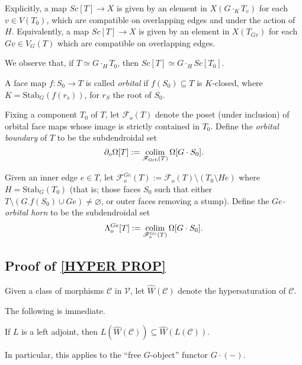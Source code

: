 \documentclass[a4paper,10pt,draft]{article}%
\numberwithin{equation}{section}%
\begin{document}
\begin{remark}
      Explicitly, a map $Sc[T] \to X$ is given by an element in $X(G \cdot_K T_v)$ for each $v \in V(T_0)$,
      which are compatible on overlapping edges and under the action of $H$.
      Equivalently, a map $Sc[T] \to X$ is given by an element in $X(T_{G v})$ for each $G v \in V_G(T)$
      which are compatible on overlapping edges.
\end{remark}

\begin{remark}
      We observe that, if $T \simeq G \cdot_H T_0$, then
      $Sc[T] \simeq G \cdot_H Sc[T_0]$.
\end{remark}

\begin{definition}
      A face map $f: S_0 \to T$ is called \textit{orbital} if
      $f(S_0) \subseteq T$ is $K$-closed, where $K = \mathrm{Stab}_G(f(r_s))$, for $r_S$ the root of $S_0$.

      Fixing a component $T_0$ of $T$,
      let $\mathscr{F}_{o}(T)$ denote the poset (under inclusion) of orbital face maps whose image is
      strictly contained in $T_0$.
      Define the \textit{orbital boundary} of $T$ to be the subdendroidal set
      \begin{equation}
            \partial_{o}\Omega[T] := \mathop{\operatorname{colim}}\limits_{\mathscr{F}_{\mathrm{Orb}}(T)}\Omega[G \cdot S_0].
      \end{equation}

      Given an inner edge $e \in T$, let
      $\mathscr{F}_{o}^{Ge}(T) := \mathscr{F}_{o}(T) \setminus (T_0\setminus H e)$
      where $H = \mathrm{Stab}_G(T_0)$
      (that is; those faces $S_0$ such that either $T \setminus (G.f(S_0) \cup Ge) \neq \varnothing$, or
      outer faces removing a stump).
      Define the \textit{$Ge$-orbital horn} to be the subdendroidal set
      \begin{equation}
            \Lambda^{Ge}_{o}[T] := \mathop{\operatorname{colim}}\limits_{\mathscr{F}_{o}^{Ge}(T)}\Omega[G\cdot S_0]. 
      \end{equation}
\end{definition}

\subsection{Proof of \ref{HYPER PROP}}

\begin{definition}
      Given a class of morphisms $\mathcal{C}$ in $\mathcal V$, let $\hat{W}(\mathcal C)$ denote
      the hypersaturation of $\mathcal C$. 
\end{definition}
The following is immediate.
\begin{lemma}
      If $L$ is a left adjoint, then $L(\hat{W}(\mathcal C)) \subseteq \hat{W}(L(\mathcal C))$.
\end{lemma}
\begin{remark}
      In particular, this applies to the ``free $G$-object'' functor $G \cdot (-)$.
\end{remark}
\end{document}
